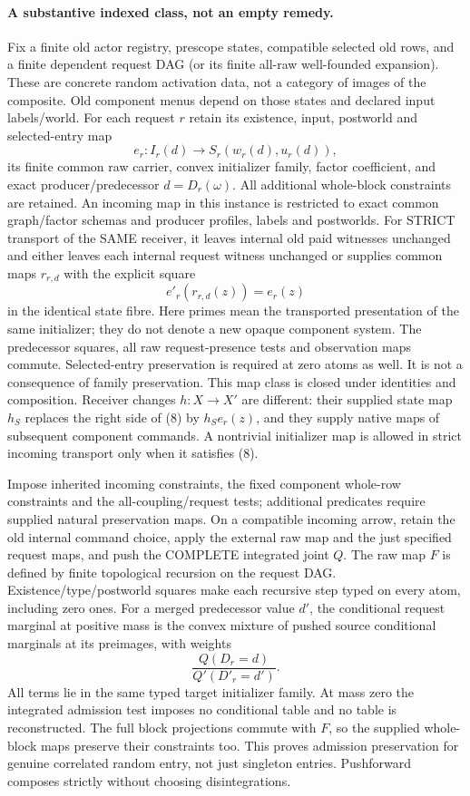 \documentclass[11pt]{article}\usepackage{amsmath,amssymb,amsthm,geometry}\geometry{margin=1in}
\begin{document}
\paragraph{A substantive indexed class, not an empty remedy.}
Fix a finite old actor registry, prescope states, compatible selected old rows, and a finite dependent request DAG (or its finite all-raw well-founded expansion). These are concrete random activation data, not a category of images of the composite. Old component menus depend on those states and declared input labels/world. For each request $r$ retain its existence, input, postworld and selected-entry map
\[
 e_r:I_r(d)\longrightarrow S_r(w_r(d),u_r(d)),
\]
its finite common raw carrier, convex initializer family, factor coefficient, and exact producer/predecessor $d=D_r(\omega)$. All additional whole-block constraints are retained. An incoming map in this instance is restricted to exact common graph/factor schemas and producer profiles, labels and postworlds. For STRICT transport of the SAME receiver, it leaves internal old paid witnesses unchanged and either leaves each internal request witness unchanged or supplies common maps $r_{r,d}$ with the explicit square
\[
 e'_r(r_{r,d}(z))=e_r(z)                                      \tag{8}
\]
in the identical state fibre. Here primes mean the transported presentation of the same initializer; they do not denote a new opaque component system. The predecessor squares, all raw request-presence tests and observation maps commute. Selected-entry preservation is required at zero atoms as well. It is not a consequence of family preservation. This map class is closed under identities and composition. Receiver changes $h:X\to X'$ are different: their supplied state map $h_S$ replaces the right side of (8) by $h_S e_r(z)$, and they supply native maps of subsequent component commands. A nontrivial initializer map is allowed in strict incoming transport only when it satisfies (8).

Impose inherited incoming constraints, the fixed component whole-row constraints and the all-coupling/request tests; additional predicates require supplied natural preservation maps. On a compatible incoming arrow, retain the old internal command choice, apply the external raw map and the just specified request maps, and push the COMPLETE integrated joint $Q$. The raw map $F$ is defined by finite topological recursion on the request DAG. Existence/type/postworld squares make each recursive step typed on every atom, including zero ones. For a merged predecessor value $d'$, the conditional request marginal at positive mass is the convex mixture of pushed source conditional marginals at its preimages, with weights
\[
 \frac{Q(D_r=d)}{Q'(D'_r=d')}.
\]
All terms lie in the same typed target initializer family. At mass zero the integrated admission test imposes no conditional table and no table is reconstructed. The full block projections commute with $F$, so the supplied whole-block maps preserve their constraints too. This proves admission preservation for genuine correlated random entry, not just singleton entries. Pushforward composes strictly without choosing disintegrations.
\end{document}
